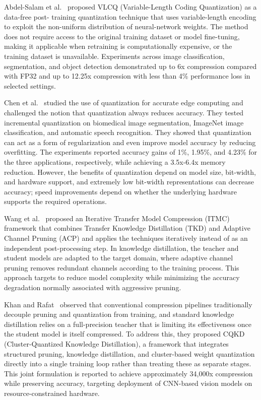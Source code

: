 \documentclass[oneside,a4paper,12pt]{report}
\begin{document}
Abdel-Salam et al.~\cite{abdelsalam2025} proposed VLCQ (Variable-Length Coding Quantization) as a data-free post- training quantization technique that uses variable-length encoding to exploit the non-uniform distribution of neural-network weights. The method does not require access to the original training dataset or model fine-tuning, making it applicable when retraining is computationally expensive, or the training dataset is unavailable. Experiments across image classification, segmentation, and object detection demonstrated up to 6x compression compared with FP32 and up to 12.25x compression with less than 4\% performance loss in selected settings.

Chen et al.~\cite{chen2021} studied the use of quantization for accurate edge computing and challenged the notion that quantization always reduces accuracy. They tested incremental quantization on biomedical image segmentation, ImageNet image classification, and automatic speech recognition. They showed that quantization can act as a form of regularization and even improve model accuracy by reducing overfitting. The experiments reported accuracy gains of 1\%, 1.95\%, and 4.23\% for the three applications, respectively, while achieving a 3.5x-6.4x memory reduction. However, the benefits of quantization depend on model size, bit-width, and hardware support, and extremely low bit-width representations can decrease accuracy; speed improvements depend on whether the underlying hardware supports the required operations.

Wang et al.~\cite{wang2025} proposed an Iterative Transfer Model Compression (ITMC) framework that combines Transfer Knowledge Distillation (TKD) and Adaptive Channel Pruning (ACP) and applies the techniques iteratively instead of as an independent post-processing step. In knowledge distillation, the teacher and student models are adapted to the target domain, where adaptive channel pruning removes redundant channels according to the training process. This approach targets to reduce model complexity while minimizing the accuracy degradation normally associated with aggressive pruning.

Khan and Rafat~\cite{khan2025} observed that conventional compression pipelines traditionally decouple pruning and quantization from training, and standard knowledge distillation relies on a full-precision teacher that is limiting its effectiveness once the student model is itself compressed. To address this, they proposed CQKD (Cluster-Quantized Knowledge Distillation), a framework that integrates structured pruning, knowledge distillation, and cluster-based weight quantization directly into a single training loop rather than treating these as separate stages. This joint formulation is reported to achieve approximately 34,000x compression while preserving accuracy, targeting deployment of CNN-based vision models on resource-constrained hardware.
\end{document}
